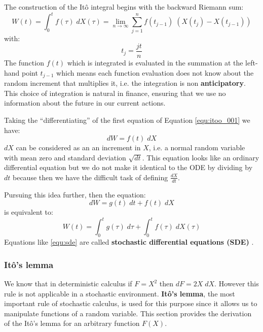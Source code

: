 The construction of the Itô integral begins with the backward Riemann sum:
\begin{equation}
    W(t) = \int_0^t f(\tau) \; dX(\tau) = \lim_{n \rightarrow \infty} \sum_{j=1}^{n} f \left( t_{j-1} \right) \; \left( X \left( t_j \right) - X \left( t_{j-1} \right) \right)
    \label{equ:itoo_001}
\end{equation}
with:
\begin{equation}
    t_j = \frac{jt}{n}
\end{equation}
The function $f(t)$ which is integrated is evaluated in the summation at the left-hand point $t_{j-1}$ which means each function evaluation does not know about the random increment that multiplies it, i.e. the integration is non \textbf{anticipatory}. This choice of integration is natural in finance, ensuring that we use no information about the future in our current actions.

Taking the ``differentiating'' of the first equation of Equation \ref{equ:itoo_001} we have:
\begin{equation}
    dW = f(t) \; dX
\end{equation}
$dX$ can be considered as an an increment in $X$, i.e. a normal random variable with mean zero and standard deviation $\sqrt{dt}$. This equation looks like an ordinary differential equation but we do not make it identical to the ODE by dividing by $dt$ because then we have the difficult task of defining $\frac{dX}{dt}$.

Pursuing this idea further, then the equation:
\begin{equation}
    dW = g(t) \; dt + f(t) \; dX
\end{equation}
is equivalent to:
\begin{equation}
    W(t) = \int_0^t g(\tau) \; d\tau + \int_0^t f(\tau) \; dX(\tau)
    \label{equ:sde}
\end{equation}
Equations like \ref{equ:sde} are called \textbf{stochastic differential equations (SDE)} . 



\subsubsection{Itô's lemma}
We know that in deterministic calculus if $F = X^2$ then $dF = 2X \; dX$. However this rule is not applicable in a stochastic environment. \textbf{Itô's lemma}, the most important rule of stochastic calculus, is used for this purpose since it allows us to manipulate functions of a random variable. This section provides the derivation of the Itô's lemma for an arbitrary function $F(X)$.

